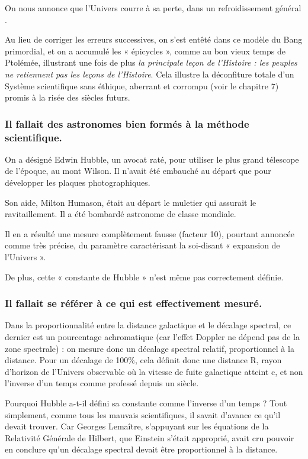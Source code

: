 \documentclass[a4paper,12pt]{article}
\begin{document}
On nous annonce que l’Univers courre à sa perte, dans un refroidissement général . 

Au lieu de corriger les erreurs successives, on s’est ent\^eté dans ce modèle du Bang primordial, et on a accumulé les « épicycles », comme au bon vieux temps de Ptolémée, illustrant une fois de plus \textit{la principale leçon de l'Histoire : les peuples ne retiennent pas les leçons de l'Histoire}. Cela illustre la déconfiture totale d'un Système scientifique sans éthique,  aberrant et corrompu (voir le chapitre 7) promis à  la risée des siècles futurs.



\subsubsection{Il fallait des astronomes bien formés à la méthode scientifique.}

 On a désigné Edwin Hubble, un avocat raté, pour utiliser le plus grand télescope de l’époque, au mont Wilson. Il n’avait été embauché au départ que pour développer les plaques photographiques.


 Son aide, Milton Humason, était au départ le muletier qui assurait le ravitaillement. Il a  été bombardé astronome de classe mondiale.


Il en a résulté une mesure complètement fausse (facteur 10), pourtant annoncée comme très précise, du paramètre caractérisant la soi-disant « expansion de l’Univers ».


De plus, cette « constante de Hubble »  n’est m\^eme pas correctement définie.




\subsubsection{Il fallait se référer à ce qui est effectivement mesuré.}

Dans la proportionnalité entre la distance galactique et le décalage spectral, ce dernier est un pourcentage achromatique (car l'effet Doppler ne dépend pas de la zone spectrale) : on mesure donc un décalage spectral relatif, proportionnel à la distance. Pour un décalage de 100\%, cela définit donc une distance R, rayon d'horizon de l'Univers observable où la vitesse de fuite galactique atteint c, et non l'inverse d'un temps comme professé depuis un siècle.


Pourquoi Hubble a-t-il défini sa constante comme l’inverse d’un temps ? Tout simplement, comme tous les mauvais scientifiques, il savait d’avance ce qu’il devait trouver. Car Georges Lema\^itre, s’appuyant sur les équations de la Relativité Générale de Hilbert, que Einstein s’était approprié,  avait cru pouvoir en conclure qu’un décalage spectral devait être proportionnel à la distance.
\end{document}
